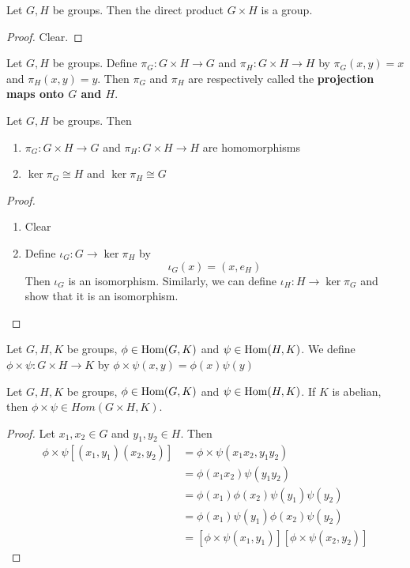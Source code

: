 \documentclass{book}
\begin{document}
	\begin{ex}
	 Let $G,H$ be groups. Then the direct product $G \times H$ is a group.
	\end{ex}
	\begin{proof}
	Clear.
	\end{proof}
	
	\begin{defn} 
	Let $G,H$ be groups. Define $\pi_G :G \times H \rightarrow G$ and $\pi_H :G \times H \rightarrow H$ by $\pi_G(x,y) = x$ and $\pi_H(x,y) = y$.  Then $\pi_G$ and $\pi_H$ are respectively called the \textbf{projection maps onto $G$ and $H$}.
	\end{defn}	
	
	\begin{ex}
	 Let $G,H$ be groups. Then 
	\begin{enumerate}
	\item $\pi_G: G \times H \rightarrow G$ and $\pi_H : G \times H \rightarrow H$ are homomorphisms
	\item $\ker \pi_G \cong H$ and $\ker \pi_H \cong G$
\end{enumerate}	 
	\end{ex}
	
	\begin{proof}\
	\begin{enumerate}
	\item Clear
	\item Define $\iota_G:G \rightarrow \ker \pi_H$ by $$\iota_G(x) = (x, e_H)$$ Then $\iota_G$ is an isomorphism. Similarly, we can define $\iota_H:H \rightarrow \ker \pi_G$ and show that it is an isomorphism.
	\end{enumerate}
	\end{proof}
	
	\begin{defn}
	Let $G,H, K$ be groups, $\phi \in \operatorname{Hom}(G,K)$ and $\psi \in \operatorname{Hom}(H, K)$. We define $\phi \times \psi: G \times H \rightarrow K$ by $\phi \times \psi(x,y) = \phi(x) \psi(y)$ 
	\end{defn}	
	
	\begin{ex}
	 Let $G,H, K$ be groups, $\phi \in \operatorname{Hom}(G,K)$ and $\psi \in \operatorname{Hom}(H, K)$. If $K$ is abelian, then $\phi \times \psi \in Hom(G \times H,K)$.
	\end{ex}
	
	\begin{proof}
	Let $x_1, x_2 \in G$ and $y_1, y_2 \in H$. Then 
	\begin{align*}
	\phi \times \psi[(x_1, y_1)(x_2, y_2)] 
	&= \phi \times \psi (x_1x_2, y_1y_2) \\
	&= \phi(x_1x_2) \psi(y_1y_2) \\
	&= \phi(x_1)\phi(x_2)\psi(y_1)\psi(y_2) \\
	&= \phi(x_1)\psi(y_1)\phi(x_2)\psi(y_2) \\
	&= [\phi \times \psi(x_1, y_1)] [\phi \times \psi(x_2, y_2) ]
	\end{align*}
	\end{proof}
	
\end{document}

